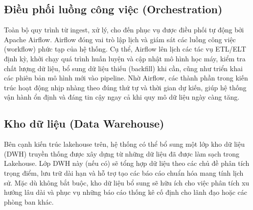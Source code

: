\subsection{Điều phối luồng công việc (Orchestration)}
Toàn bộ quy trình từ ingest, xử lý, cho đến phục vụ được điều phối tự động bởi Apache Airflow. Airflow đóng vai trò lập lịch và giám sát các luồng công việc (workflow) phức tạp của hệ thống. Cụ thể, Airflow lên lịch các tác vụ ETL/ELT định kỳ, khởi chạy quá trình huấn luyện và cập nhật mô hình học máy, kiểm tra chất lượng dữ liệu, bổ sung dữ liệu thiếu (backfill) khi cần, cũng như triển khai các phiên bản mô hình mới vào pipeline. Nhờ Airflow, các thành phần trong kiến trúc hoạt động nhịp nhàng theo đúng thứ tự và thời gian dự kiến, giúp hệ thống vận hành ổn định và đáng tin cậy ngay cả khi quy mô dữ liệu ngày càng tăng.
\subsection{Kho dữ liệu (Data Warehouse)}
Bên cạnh kiến trúc lakehouse trên, hệ thống có thể bổ sung một lớp kho dữ liệu (DWH) truyền thống được xây dựng từ những dữ liệu đã được làm sạch trong Lakehouse. Lớp DWH này (nếu có) sẽ tổng hợp dữ liệu theo các chủ đề phân tích trọng điểm, lưu trữ dài hạn và hỗ trợ tạo các báo cáo chuẩn hóa mang tính lịch sử. Mặc dù không bắt buộc, kho dữ liệu bổ sung sẽ hữu ích cho việc phân tích xu hướng lâu dài và phục vụ những báo cáo thống kê cố định cho lãnh đạo hoặc các phòng ban khác.